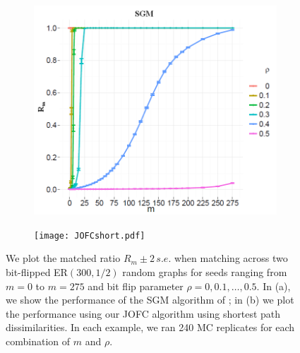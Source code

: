 \documentclass[12pt]{article}
\numberwithin{equation}{section}
\theoremstyle{definition}
\begin{document}
\begin{figure}
\label{fig2}%
\begin{subfigure}{.16\linewidth}
\centering
\includegraphics[width=3\textwidth]{sgmbf.PNG}
\caption{}
\label{fig:sub1}
\end{subfigure}%
\hspace{60mm}
\begin{subfigure}{.17\linewidth}
\centering
\texttt{[image: JOFCshort.pdf]}
\caption{}
\label{fig:sub3}
\end{subfigure}
\caption{We plot the matched ratio $R_m\pm 2\, s.e.$ when matching
    across two bit-flipped ER$(300,1/2)$ random graphs for seeds ranging
    from $m=0$ to $m=275$ and bit flip parameter
    $\rho=0,0.1,\ldots,0.5$.  In (a), we show the performance of the SGM
    algorithm of \cite{FAP}; in (b) 
    we plot the performance using our JOFC algorithm
    using shortest path dissimilarities. 
    In each example, we ran 240 MC
    replicates for each combination of $m$ and $\rho$.}
\label{fig:fig2}
\end{figure}
\end{document}

